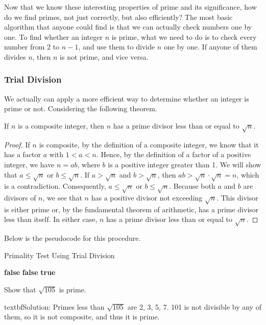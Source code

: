         Now that we know these interesting properties of prime and its significance, how do we find
        primes, not just correctly, but also efficiently? The most basic algorithm that anyone
        could find is that we can actually check numbers one by one. To find whether an integer $n$ is prime, what we need to do is to check every number from 2 to $n-1$, and use them to divide $n$ one by one. If anyone of them divides $n$, then $n$ is not prime, and vice versa.
        \subsubsection*{Trial Division}
        We actually can apply a more efficient way to determine whether an integer is prime or not.
        Considering the following theorem.
        \begin{theorem}
            If \( n \) is a composite integer, then \( n \) has a prime divisor less than or equal to \( \sqrt{n} \).
        \end{theorem}
        \begin{proof}
            If \( n \) is composite, by the definition of a composite integer, we know that it has a factor \( a \) with \( 1 < a < n \). Hence, by the definition of a factor of a positive integer, we have \( n = ab \), where \( b \) is a positive integer greater than 1. We will show that \( a \leq \sqrt{n} \) or \( b \leq \sqrt{n} \). If \( a > \sqrt{n} \) and \( b > \sqrt{n} \), then \( ab > \sqrt{n} \cdot \sqrt{n} = n \), which is a contradiction. Consequently, \( a \leq \sqrt{n} \) or \( b \leq \sqrt{n} \). Because both \( a \) and \( b \) are divisors of \( n \), we see that \( n \) has a positive divisor not exceeding \( \sqrt{n} \). This divisor is either prime or, by the fundamental theorem of arithmetic, has a prime divisor less than itself. In either case, \( n \) has a prime divisor less than or equal to \( \sqrt{n} \).
            \end{proof}
        Below is the pseudocode for this procedure.
        \begin{algorithm}
            \caption{Primality Test Using Trial Division}
            \begin{algorithmic}[1]
            
                    \State \Return \textbf{false}
                \EndIf
                        \State \Return \textbf{false}
                    \EndIf
                \EndFor
                \State \Return \textbf{true}
            \EndFunction
            
            \end{algorithmic}
            \end{algorithm}
        \begin{example}
            Show that $\sqrt{105}$ is prime.
        \end{example} 
        textbf{Solution:} Primes less than $\sqrt{105}$ are 2, 3, 5, 7. 101 is not divisible
        by any of them, so it is not composite, and thus it is prime.

